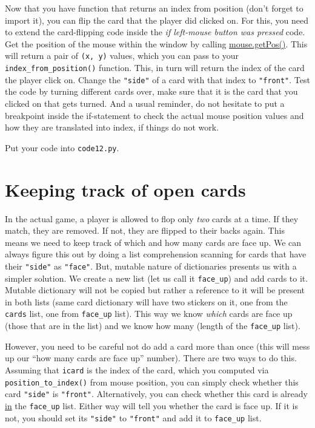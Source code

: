 \documentclass[
]{book}
\begin{document}
Now that you have function that returns an index from position (don't forget to import it), you can flip the card that the player did clicked on. For this, you need to extend the card-flipping code inside the \emph{if left-mouse button was pressed} code. Get the position of the mouse within the window by calling \href{https://psychopy.org/api/event.html\#psychopy.event.Mouse.getPos}{mouse.getPos()}. This will return a pair of \texttt{(x,\ y)} values, which you can pass to your \texttt{index\_from\_position()} function. This, in turn will return the index of the card the player click on. Change the \texttt{"side"} of a card with that index to \texttt{"front"}. Test the code by turning different cards over, make sure that it is the card that you clicked on that gets turned. And a usual reminder, do not hesitate to put a breakpoint inside the if-statement to check the actual mouse position values and how they are translated into index, if things do not work.

Put your code into \texttt{code12.py}.

\hypertarget{keeping-track-of-open-cards}{%
\section{Keeping track of open cards}\label{keeping-track-of-open-cards}}

In the actual game, a player is allowed to flop only \emph{two} cards at a time. If they match, they are removed. If not, they are flipped to their backs again. This means we need to keep track of which and how many cards are face up. We can always figure this out by doing a list comprehension scanning for cards that have their \texttt{"side"} as \texttt{"face"}. But, mutable nature of dictionaries presents us with a simpler solution. We create a new list (let us call it \texttt{face\_up}) and add cards to it. Mutable dictionary will not be copied but rather a reference to it will be present in both lists (same card dictionary will have two stickers on it, one from the \texttt{cards} list, one from \texttt{face\_up} list). This way we know \emph{which} cards are face up (those that are in the list) and we know how many (length of the \texttt{face\_up} list).

However, you need to be careful not do add a card more than once (this will mess up our ``how many cards are face up'' number). There are two ways to do this. Assuming that \texttt{icard} is the index of the card, which you computed via \texttt{position\_to\_index()} from mouse position, you can simply check whether this card \texttt{"side"} is \texttt{"front"}. Alternatively, you can check whether this card is already \href{https://docs.python.org/3/reference/expressions.html?highlight=list\%20dictionary\#in}{in} the \texttt{face\_up} list. Either way will tell you whether the card is face up. If it is not, you should set its \texttt{"side"} to \texttt{"front"} and add it to \texttt{face\_up} list.
\end{document}
